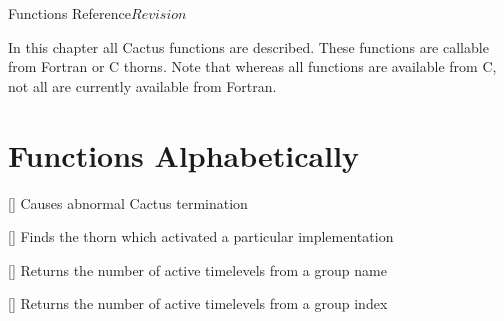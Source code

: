 
\begin{cactuspart}{ Functions Reference}{}{$Revision$}
\label{part:CCTKReference}
\renewcommand{\thepage}{\Alph{part}\arabic{page}}

In this chapter all  Cactus functions are described.
These functions are callable from Fortran or C thorns.  Note that whereas
all functions are available from C, not all are currently available
from Fortran.


\chapter{Functions Alphabetically}


\begin{Lentry}

\item[\code{CCTK\_Abort}] [\pageref{CCTK-Abort}]
  Causes abnormal Cactus termination

\item[\code{CCTK\_ActivatingThorn}] [\pageref{CCTK-ActivatingThorn}]
  Finds the thorn which activated a particular implementation

\item[\code{CCTK\_ActiveTimeLevels}] [\pageref{CCTK-ActiveTimeLevels}]
  Returns the number of active timelevels from a group name

\item[\code{CCTK\_ActiveTimeLevelsGI}] [\pageref{CCTK-ActiveTimeLevels}]
  Returns the number of active timelevels from a group index


\end{Lentry}
\end{cactuspart}
